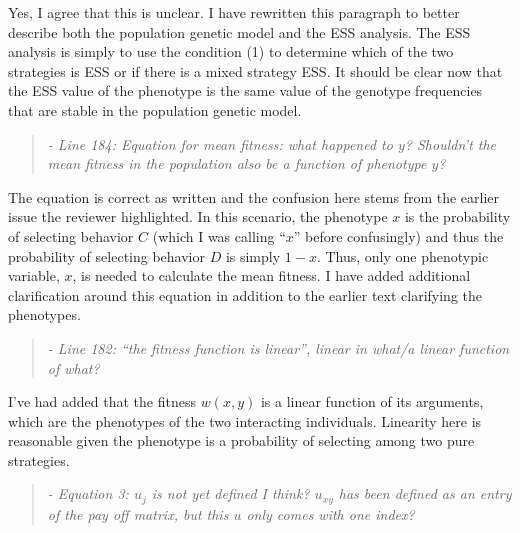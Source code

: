 \documentclass[10pt,parskip=full,foldmarks=off,addrfield=off,backaddress=false,refline=dateleft,letterpaper]{scrlttr2}
\newenvironment{reviewerquote}{\begin{quote}\color{DarkBlue}\itshape}{\end{quote}}
\begin{document}
\begin{letter}
Yes, I agree that this is unclear. I have rewritten this paragraph to better describe both the population genetic model and the ESS analysis. The ESS analysis is simply to use the condition (1) to determine which of the two strategies is ESS or if there is a mixed strategy ESS. It should be clear now that the ESS value of the phenotype is the same value of the genotype frequencies that are stable in the population genetic model.

\begin{reviewerquote}
  - Line 184: Equation for mean fitness: what happened to $y$? Shouldn’t the mean fitness in the population also be a function of phenotype $y$?
\end{reviewerquote}

The equation is correct as written and the confusion here stems from the earlier issue the reviewer highlighted. In this scenario, the phenotype $x$ is the probability of selecting behavior $C$ (which I was calling ``$x$'' before confusingly) and thus the probability of selecting behavior $D$ is simply $1-x$. Thus, only one phenotypic variable, $x$, is needed to calculate the mean fitness. I have added additional clarification around this equation in addition to the earlier text clarifying the phenotypes.

\begin{reviewerquote}
  - Line 182: “the fitness function is linear”, linear in what/a linear function of what?
\end{reviewerquote}

I've had added that the fitness $w(x,y)$ is a linear function of its arguments, which are the phenotypes of the two interacting individuals. Linearity here is reasonable given the phenotype is a probability of selecting among two pure strategies.

\begin{reviewerquote}
  - Equation 3: $u_j$ is not yet defined I think? $u_{xy}$ has been defined as an entry of the pay off matrix, but this $u$ only comes with one index?
\end{reviewerquote}




\end{letter}
\end{document}
